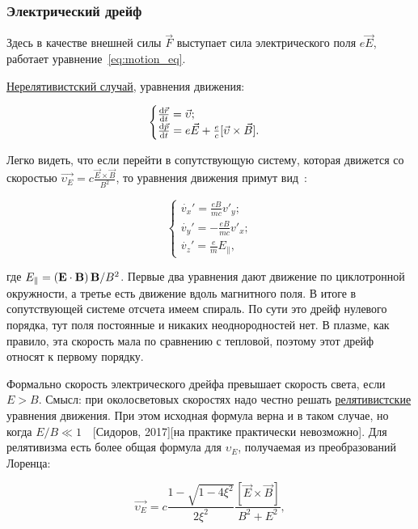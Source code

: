 \documentclass[10pt, a4paper]{article}
\newcommand{\Sidorov}{~[Сидоров, 2017]}
\begin{document}
\subsubsection{Электрический дрейф} \label{subsubsec:e_drift}

Здесь в качестве внешней силы $\vec{F}$ выступает сила электрического поля $e\vec{E}$, работает уравнение~\eqref{eq:motion_eq}.

\uline{Нерелятивистский случай}, уравнения движения:

\begin{equation}
    \begin{cases}
        \dv{\vec{r}}{t} = \vec{\upsilon}; \\
        \dv{\vec{p}}{t} = e\vec{E} + \frac{e}{c}[\vec{\upsilon} \times \vec{B}].
    \end{cases}
\end{equation}

Легко видеть, что если перейти в сопутствующую систему, которая движется со скоростью $\overrightarrow{\upsilon_E} = c\frac{\vec{E}\times \vec{B}}{B^2}$, то уравнения движения примут вид~\cite{kotelnikov}:

\begin{equation}
    \begin{cases}
    \dot{v_x}'=  \frac{eB}{mc} v'_y; \\
    \dot{v_y}'= -\frac{eB}{mc} v'_x; \\
    \dot{v_z}'=  \frac{e}{m} E_{\parallel},
    \end{cases}
\end{equation}

где $E_{\parallel}=\left(\vb{E}\cdot\vb{B}\right)\vb{B}/B^2$. Первые два уравнения дают движение по циклотронной окружности, а третье есть движение вдоль магнитного поля. В итоге в сопутствующей системе отсчета имеем спираль. По сути это дрейф нулевого порядка, тут поля постоянные и никаких неоднородностей нет. В плазме, как правило, эта скорость мала по сравнению с тепловой, поэтому этот дрейф относят к первому порядку.

Формально скорость электрического дрейфа превышает скорость света, если $E>B$. Смысл: при околосветовых скоростях надо честно решать \uline{релятивистские} уравнения движения. При этом исходная формула верна и в таком случае, но когда $E/B \ll 1$~\Sidorov [на практике практически невозможно]. Для релятивизма есть более общая формула для $\upsilon_E$, получаемая из преобразований Лоренца:

\begin{equation}
	\overrightarrow{\upsilon_E} = c \frac{1-\sqrt{1-4\xi^2}}{2\xi^2} \frac{\left[\vec{E} \times \vec{B}\right] }{B^2 + E^2},
\end{equation}
\end{document}
